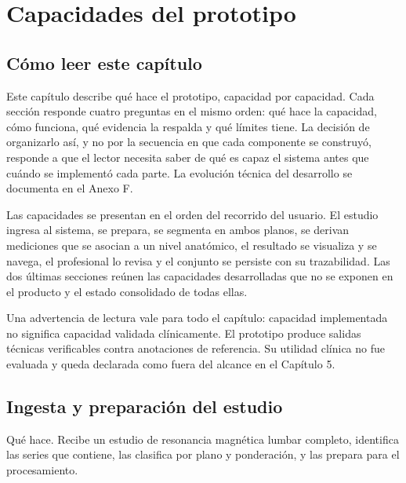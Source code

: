 \chapter{Capacidades del prototipo}
\label{chap:capacidades-prototipo}

\section{Cómo leer este capítulo}

Este capítulo describe qué hace el prototipo, capacidad por capacidad. Cada sección responde cuatro preguntas en el mismo orden: qué hace la capacidad, cómo funciona, qué evidencia la respalda y qué límites tiene. La decisión de organizarlo así, y no por la secuencia en que cada componente se construyó, responde a que el lector necesita saber de qué es capaz el sistema antes que cuándo se implementó cada parte. La evolución técnica del desarrollo se documenta en el Anexo F.

Las capacidades se presentan en el orden del recorrido del usuario. El estudio ingresa al sistema, se prepara, se segmenta en ambos planos, se derivan mediciones que se asocian a un nivel anatómico, el resultado se visualiza y se navega, el profesional lo revisa y el conjunto se persiste con su trazabilidad. Las dos últimas secciones reúnen las capacidades desarrolladas que no se exponen en el producto y el estado consolidado de todas ellas.

Una advertencia de lectura vale para todo el capítulo: capacidad implementada no significa capacidad validada clínicamente. El prototipo produce salidas técnicas verificables contra anotaciones de referencia. Su utilidad clínica no fue evaluada y queda declarada como fuera del alcance en el Capítulo 5.

\section{Ingesta y preparación del estudio}

Qué hace. Recibe un estudio de resonancia magnética lumbar completo, identifica las series que contiene, las clasifica por plano y ponderación, y las prepara para el procesamiento.

